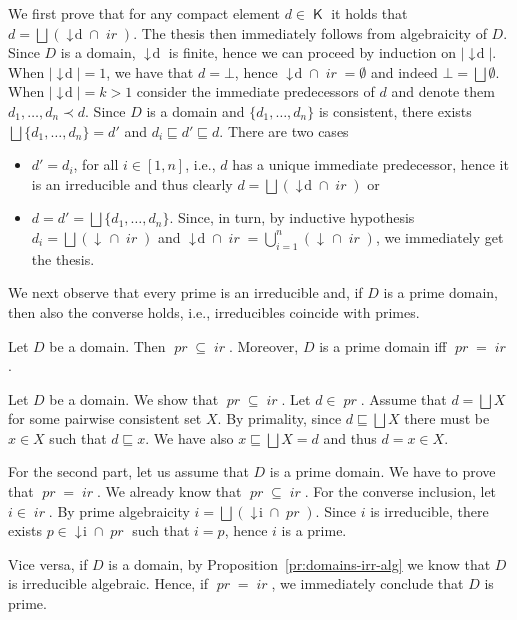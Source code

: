 \documentclass[conference]{IEEEtran}
\renewenvironment{proof}{\begin{IEEEproof}}{\end{IEEEproof}}
\newcommand{\compact}[1]{\ensuremath{\mathop{\mathsf{K}({#1})}}}
\newcommand{\principal}[1]{\ensuremath{\mathop{\downarrow\!{#1}}}}
\newcommand{\pr}[1]{\ensuremath{\mathop{\mathit{pr}({#1})}}}
\newcommand{\ir}[1]{\ensuremath{\mathop{\mathit{ir}({#1})}}}
\newcommand{\interval}[2][1]{\ensuremath{[{#1},{#2}]}}
\begin{document}
\begin{proof}
  We first prove that for any compact element $d \in \compact{D}$ it
  holds that $d = \bigsqcup (\principal{d} \cap \ir{D})$. 
  The thesis then immediately follows from algebraicity of $D$. Since
  $D$ is a domain, $\principal{d}$ is finite, hence we can proceed by
  induction on $|\principal{d}|$. When $|\principal{d}| = 1$, we have
  that $d = \bot$, hence $\principal{d} \cap \ir{D} = \emptyset$ and
  indeed $\bot = \bigsqcup \emptyset$. When $|\principal{d}| = k > 1$
  consider the immediate predecessors of $d$ and denote them
  $d_1, \ldots, d_n \prec d$. Since $D$ is a domain and
  $\{ d_1, \ldots, d_n \}$ is consistent, there exists
  $\bigsqcup \{ d_1, \ldots, d_n \} = d'$ and
  $d_i \sqsubseteq d' \sqsubseteq d$. There are two cases
  \begin{itemize}
  \item $d' = d_i$, for all $i \in \interval{n}$,
    i.e., $d$ has a unique immediate predecessor, hence it is an
    irreducible and thus clearly $d = \bigsqcup (\principal{d} \cap \ir{D})$ or
  \item $d = d' = \bigsqcup \{ d_1, \ldots, d_n \}$. Since, in turn,
    by inductive hypothesis $d_i = \bigsqcup (\principal{d_i} \cap \ir{D})$ 
    and $\principal{d} \cap \ir{D}= \bigcup_{i=1}^n (\principal{d_i} \cap \ir{D})$,
    we immediately get the thesis.
  \end{itemize}
\end{proof}


We next observe that every prime is an irreducible and, if $D$ is a
prime domain, then also the converse holds, i.e., irreducibles
coincide with primes.


\begin{proposition}
  \label{pr:irr-prime-alg}
  Let $D$ be a domain. Then $\pr{D} \subseteq \ir{D}$. Moreover, $D$ is a
  prime domain iff $\pr{D} = \ir{D}$.
\end{proposition}


\begin{proof}
  Let $D$ be a domain. We show that $\pr{D} \subseteq \ir{D}$. Let
  $d \in \pr{D}$. Assume that $d = \bigsqcup X$ for some pairwise
  consistent set $X$. By primality, since $d \sqsubseteq \bigsqcup X$
  there must be $x \in X$ such that $d \sqsubseteq x$. We have also
  $x \sqsubseteq \bigsqcup X = d$ and thus $d=x \in X$.

    \medskip
    
    For the second part, let us assume that $D$ is a prime domain. We have to prove that $\pr{D} = \ir{D}$. We already know that $\pr{D} \subseteq \ir{D}$.
  For the converse inclusion, let $i \in \ir{D}$. By
  prime algebraicity $i =\bigsqcup (\principal{i} \cap
  \pr{D})$. Since $i$ is irreducible, there exists
  $p \in \principal{i} \cap \pr{D}$ such that $i = p$, hence $i$ is
  a prime.

  Vice versa, if $D$ is a domain, by Proposition~\ref{pr:domains-irr-alg} we
  know that $D$ is irreducible algebraic. Hence, if $\pr{D} = \ir{D}$,
  we immediately conclude that $D$ is prime.
\end{proof}
\end{document}
